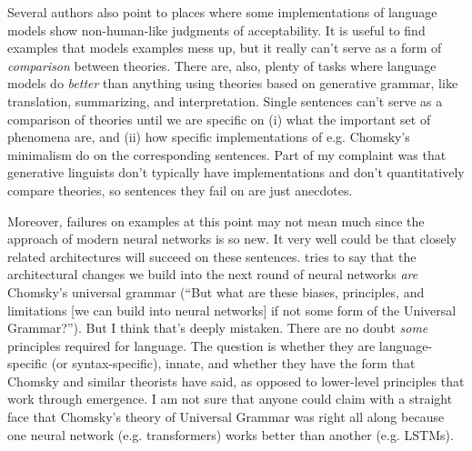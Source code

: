 \documentclass[output=paper,colorlinks,citecolor=brown
]{langscibook}
\begin{document}
Several authors also point to places where some implementations of language models show non-human-like judgments of acceptability. It is useful to find examples that models examples mess up, but it really can't serve as a form of \textit{comparison} between theories. There are, also, plenty of tasks where language models do \textit{better} than anything using theories based on generative grammar, like translation, summarizing, and interpretation. Single sentences can't serve as a comparison of theories until we are specific on (i) what the important set of phenomena are, and (ii) how specific implementations of e.g. Chomsky's minimalism do on the corresponding sentences. Part of my complaint was that generative linguists don't typically have implementations and don't quantitatively compare theories, so sentences they fail on are just anecdotes.



Moreover, failures on examples at this point may not mean much since the approach of modern neural networks is so new. It very well could be that closely related architectures will succeed on these sentences. \citet{kodner2023linguistics} tries to say that the architectural changes we build into the next round of neural networks \textit{are} Chomsky's universal grammar (``But what are these biases, principles, and limitations [we can build into neural networks] if not some form of the  Universal Grammar?''). But I think that's deeply mistaken. There are no doubt \textit{some} principles required for language. The question is whether they are language-specific (or syntax-specific), innate, and whether they have the form that Chomsky and similar theorists have said, as opposed to lower-level principles that work through emergence. I am not sure that anyone could claim with a straight face that Chomsky's theory of Universal Grammar was right all along because one neural network (e.g. transformers) works better than another (e.g. LSTMs). %


\end{document}
